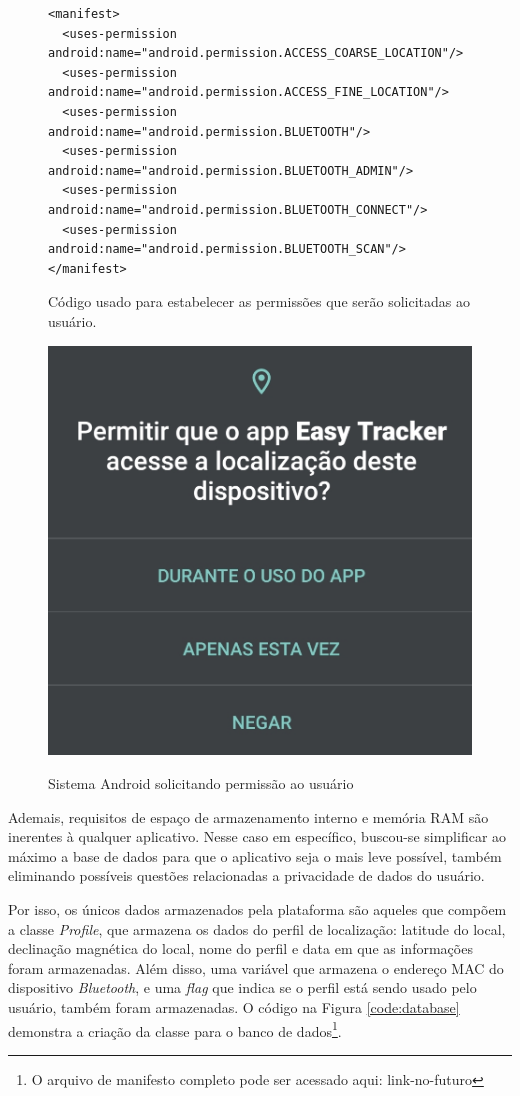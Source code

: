 \begin{figure}[htb]
	\centering
	\caption{Código usado para estabelecer as permissões que serão solicitadas ao usuário.}
	\vspace{-15pt}
	\begin{verbatim}
<manifest>
  <uses-permission android:name="android.permission.ACCESS_COARSE_LOCATION"/>
  <uses-permission android:name="android.permission.ACCESS_FINE_LOCATION"/>
  <uses-permission android:name="android.permission.BLUETOOTH"/>
  <uses-permission android:name="android.permission.BLUETOOTH_ADMIN"/>
  <uses-permission android:name="android.permission.BLUETOOTH_CONNECT"/>
  <uses-permission android:name="android.permission.BLUETOOTH_SCAN"/>
</manifest>
\end{verbatim}
\label{code:uses-permission}
	\vspace{-30pt}
\end{figure}

\begin{figure}[htb]
	\centering
	\caption{Sistema Android solicitando permissão ao usuário}
	\includegraphics[width=0.35\linewidth]{figuras/desAplicativo/permission}
	\label{fig:permissaoandroid}
\end{figure}

Ademais, requisitos de espaço de armazenamento interno e memória RAM são inerentes à qualquer aplicativo. Nesse caso em específico, buscou-se simplificar ao máximo a base de dados para que o aplicativo seja o mais leve possível, também eliminando possíveis questões relacionadas a privacidade de dados do usuário.

Por isso, os únicos dados armazenados pela plataforma são aqueles que compõem a classe \textit{Profile}, que armazena os dados do perfil de localização: latitude do local, declinação magnética do local, nome do perfil e data em que as informações foram armazenadas. Além disso, uma variável que armazena o endereço MAC do dispositivo \textit{Bluetooth}, e uma \textit{flag} que indica se o perfil está sendo usado pelo usuário, também foram armazenadas. O código na Figura \ref{code:database} demonstra a criação da classe para o banco de dados\footnote{O arquivo de manifesto completo pode ser acessado aqui: link-no-futuro}.

